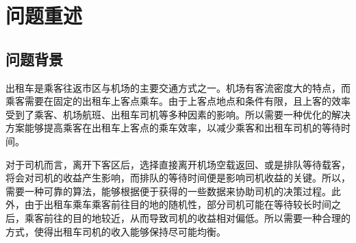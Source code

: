 \documentclass{cumcm}
\begin{document}
\newpage
\section{问题重述}
\subsection{问题背景}
出租车是乘客往返市区与机场的主要交通方式之一。机场有客流密度大的特点，而乘客需要在固定的出租车上客点乘车。由于上客点地点和条件有限，且上客的效率受到了乘客、机场航班、出租车司机等多种因素的影响。所以需要一种优化的解决方案能够提高乘客在出租车上客点的乘车效率，以减少乘客和出租车司机的等待时间。\par
对于司机而言，离开下客区后，选择直接离开机场空载返回、或是排队等待载客，将会对司机的收益产生影响，而排队的等待时间便是影响司机收益的关键。所以，需要一种可靠的算法，能够根据便于获得的一些数据来协助司机的决策过程。此外，由于出租车乘车乘客前往目的地的随机性，部分司机可能在等待较长时间之后，乘客前往的目的地较近，从而导致司机的收益相对偏低。所以需要一种合理的方式，使得出租车司机的收入能够保持尽可能均衡。
\end{document}
